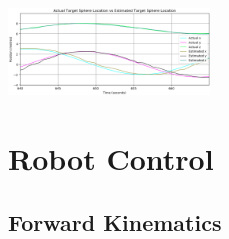 \documentclass[11pt]{article}
\begin{document}
\begin{center}
    \includegraphics[width=0.4\textwidth]{images/2.2_target.png}
\end{center}

\section{Robot Control}
\subsection{Forward Kinematics}
\end{document}
